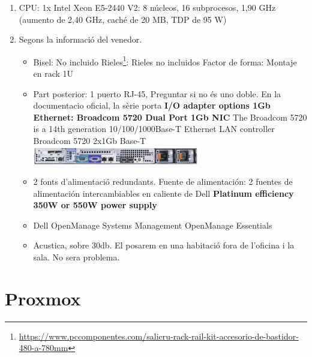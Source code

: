 \documentclass[
  10pt,
]{krantz}
\DeclareRobustCommand{\href}[2]{#2\footnote{\url{#1}}}
\providecommand{\tightlist}{%
  \setlength{\itemsep}{0pt}\setlength{\parskip}{0pt}}
\begin{document}
\begin{enumerate}
  \begin{itemize}
  \tightlist
  \item
    pfSense Min 1GB (imatge oficial), 2GB
  \item
    Znemindre NVR video 4 GB, si sobra, posar un poc mes, com anem a fer registre directe, sense detecció de moviment, no requereix tants recursos.
  \item
    Nextcloud Min 2GB, recomanat + 8GB
  \item
    Ldap, web server, antenes wifi, Collabora office server, algun altre servei futur, si es vol mail intern \ldots{} 8GB.
  \item
    Truenas, minim 8GB, quant mes millor. Les exigencies de ZFA son altes.
  \end{itemize}
\item
  CPU: 1x Intel Xeon E5-2440 V2: 8 núcleos, 16 subprocesos, 1,90 GHz (aumento de 2,40 GHz, caché de 20 MB, TDP de 95 W)
\item
  Segons la informació del venedor.

  \begin{itemize}
  \item
    Bisel: No incluido \href{https://www.pccomponentes.com/salicru-rack-rail-kit-accesorio-de-bastidor-480-a-780mm}{Rieles}: Rieles no incluidos Factor de forma: Montaje en rack 1U
  \item
    Part posterior: 1 puerto RJ-45, Preguntar si no és uno doble. En la documentacio oficial, la sèrie porta \textbf{I/O adapter options 1Gb Ethernet: Broadcom 5720 Dual Port 1Gb NIC} The Broadcom 5720 is a 14th generation 10/100/1000Base-T Ethernet LAN controller Broadcom 5720 2x1Gb Base-T \includegraphics[width=0.6\textwidth,height=\textheight]{imatges/ser_back.png}
  \item
    2 fonts d'alimentació redundants. Fuente de alimentación: 2 fuentes de alimentación intercambiables en caliente de Dell \textbf{Platinum efficiency 350W or 550W power supply}
  \item
    Dell OpenManage Systems Management OpenManage Essentials
  \item
    Acustica, sobre 30db. El posarem en una habitació fora de l'oficina i la sala. No sera problema.
  \end{itemize}
\end{enumerate}

\hypertarget{proxmox}{%
\chapter{Proxmox}\label{proxmox}}
\end{document}
